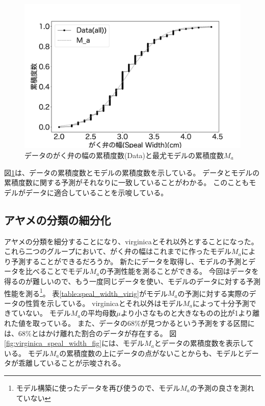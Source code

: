 \begin{figure}
    \begin{center}
        \includegraphics[width=15cm]{./image/15_/speal_width_all.pdf}
        \caption{データのがく弁の幅の累積度数(Data)と最尤モデルの累積度数$M_a$}
        \label{fig:all_speal_width_fig}
    \end{center}
\end{figure}

図\ref{fig:all_speal_width_fig}は、データの累積度数とモデルの累積度数を示している。
データとモデルの累積度数に関する予測がそれなりに一致していることがわかる。
このこともモデルがデータに適合していることを示唆している。

\subsection{アヤメの分類の細分化}
アヤメの分類を細分することになり、virginicaとそれ以外とすることになった。
これら二つのグループにおいて、がく弁の幅はこれまでに作ったモデル$M_a$により予測することができるだろうか。
新たにデータを取得し、モデルの予測とデータを比べることでモデル$M_a$の予測性能を測ることができる。
今回はデータを得るのが難しいので、もう一度同じデータを使い、モデルのデータに対する予測性能を測る\footnote{モデル構築に使ったデータを再び使うので、モデル$M_a$の予測の良さを測れていない}。
表\ref{table:speal_width_virig}がモデル$M_a$の予測に対する実際のデータの性質を示している。
virginicaとそれ以外はモデル$M_a$によって十分予測できていない。
モデル$M_a$の平均母数$\mu$より小さなものと大きなものの比が1より離れた値を取っている。
また、データの$68\%$が見つかるという予測をする区間には、$68\%$とはかけ離れた割合のデータが存在する。
図\ref{fig:virginica_speal_width_fig}には、モデル$M_a$とデータの累積度数を表示している。
モデル$M_a$の累積度数の上にデータの点がないことからも、モデルとデータが乖離していることが示唆される。
 

